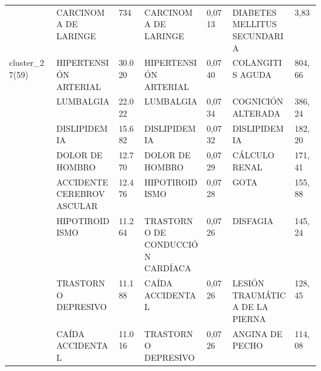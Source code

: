 \begin{landscape}
\begin{longtable}[c]{@{}lp{0.2\linewidth}lp{0.2\linewidth}lp{0.2\linewidth}l@{}}
                                  & CARCINOMA DE LARINGE                                          & 734    & CARCINOMA DE LARINGE                                   & 0,0713 & DIABETES MELLITUS SECUNDARIA                                  & 3,83     \\
\multirow{10}{*}{cluster\_27(59)} & HIPERTENSIÓN ARTERIAL                                         & 30.020 & HIPERTENSIÓN ARTERIAL                                  & 0,0740 & COLANGITIS AGUDA                                              & 804,66   \\
                                  & LUMBALGIA                                                     & 22.022 & LUMBALGIA                                              & 0,0734 & COGNICIÓN ALTERADA                                            & 386,24   \\
                                  & DISLIPIDEMIA                                                  & 15.682 & DISLIPIDEMIA                                           & 0,0732 & DISLIPIDEMIA                                                  & 182,20   \\
                                  & DOLOR DE HOMBRO                                               & 12.770 & DOLOR DE HOMBRO                                        & 0,0729 & CÁLCULO RENAL                                                 & 171,41   \\
                                  & ACCIDENTE CEREBROVASCULAR                                     & 12.476 & HIPOTIROIDISMO                                         & 0,0728 & GOTA                                                          & 155,88   \\
                                  & HIPOTIROIDISMO                                                & 11.264 & TRASTORNO DE CONDUCCIÓN CARDÍACA                       & 0,0726 & DISFAGIA                                                      & 145,24   \\
                                  & TRASTORNO DEPRESIVO                                           & 11.188 & CAÍDA ACCIDENTAL                                       & 0,0726 & LESIÓN TRAUMÁTICA DE LA PIERNA                                & 128,45   \\
                                  & CAÍDA ACCIDENTAL                                              & 11.016 & TRASTORNO DEPRESIVO                                    & 0,0726 & ANGINA DE PECHO                                               & 114,08   \\

\end{longtable}
\end{landscape}

